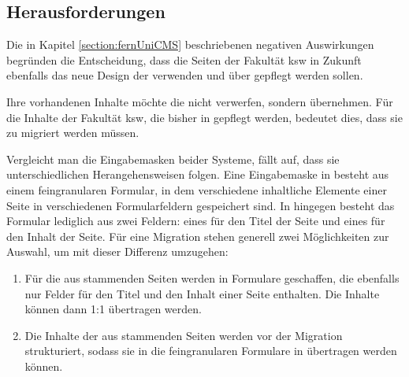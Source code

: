         \subsection{Herausforderungen}
            \label{section:fernUniChallenges}
            Die in Kapitel \ref{section:fernUniCMS} beschriebenen negativen Auswirkungen 
            begründen die Entscheidung, dass die Seiten der Fakultät \gls{ksw}
            in Zukunft ebenfalls das neue Design der {\fernUni} verwenden und
            über {\imperia} gepflegt werden sollen.

            Ihre vorhandenen Inhalte möchte die {\fernUni} nicht verwerfen, sondern übernehmen.
            Für die Inhalte der Fakultät \gls{ksw}, die bisher in {\wordpress} gepflegt werden,
            bedeutet dies, dass sie zu {\imperia} migriert werden müssen.

            Vergleicht man die Eingabemasken beider Systeme, fällt auf,
            dass sie unterschiedlichen Herangehensweisen folgen.
            Eine Eingabemaske in {\imperia} besteht aus einem feingranularen Formular,
            in dem verschiedene inhaltliche Elemente einer Seite in verschiedenen Formularfeldern
            gespeichert sind.
            In {\wordpress} hingegen besteht das Formular lediglich aus zwei Feldern:
            eines für den Titel der Seite und eines für den Inhalt der Seite.
            Für eine Migration stehen generell zwei Möglichkeiten zur Auswahl,
            um mit dieser Differenz umzugehen:

            \begin{enumerate}
                \item   Für die aus {\wordpress} stammenden Seiten werden in {\imperia} Formulare geschaffen,
                        die ebenfalls nur Felder für den Titel und den Inhalt einer Seite enthalten.
                        Die Inhalte können dann 1:1 übertragen werden.
                \item   Die Inhalte der aus {\wordpress} stammenden Seiten werden vor der Migration strukturiert,
                        sodass sie in die feingranularen Formulare in {\imperia} übertragen werden können.
            \end{enumerate}

